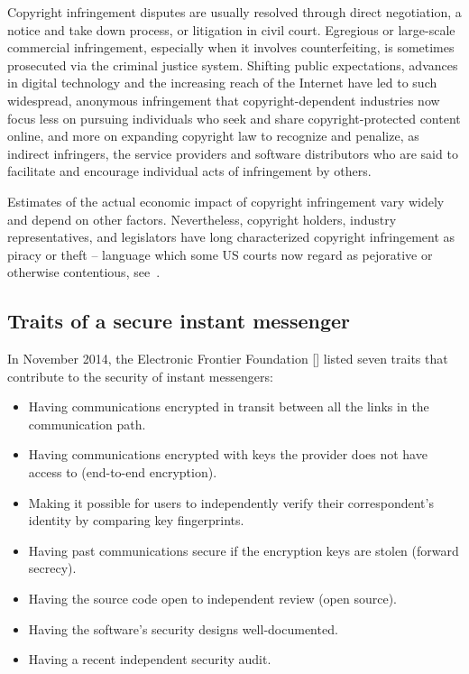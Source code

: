 Copyright infringement disputes are usually resolved through direct negotiation, a notice and take down process, or
litigation in civil court.
Egregious or large-scale commercial infringement, especially when it involves counterfeiting, is sometimes prosecuted
via the criminal justice system.
Shifting public expectations, advances in digital technology and the increasing reach of the Internet have led to such
widespread, anonymous infringement that copyright-dependent industries now focus less on pursuing individuals who seek
and share copyright-protected content online, and more on expanding copyright law to recognize and
penalize, as indirect infringers, the service providers and software distributors who are said to facilitate and
encourage individual acts of infringement by others.

Estimates of the actual economic impact of copyright infringement vary widely and depend on other factors.
Nevertheless, copyright holders, industry representatives, and legislators have long characterized copyright
infringement as piracy or theft – language which some US courts now regard as pejorative or otherwise contentious,
see~\cite{powell1984dowling, li2009intellectual}.

\subsection{Traits of a secure instant messenger}\label{subsec:traits-of-a-secure-instant-messenger}

In November 2014, the Electronic Frontier Foundation [\cite{von2010electronic}] listed seven traits that contribute to
the security of instant messengers:

\begin{itemize}
    \item Having communications encrypted in transit between all the links in the communication path.
    \item Having communications encrypted with keys the provider does not have access to (end-to-end encryption).
    \item Making it possible for users to independently verify their correspondent's identity by comparing key fingerprints.
    \item Having past communications secure if the encryption keys are stolen (forward secrecy).
    \item Having the source code open to independent review (open source).
    \item Having the software's security designs well-documented.
    \item Having a recent independent security audit.
\end{itemize}

